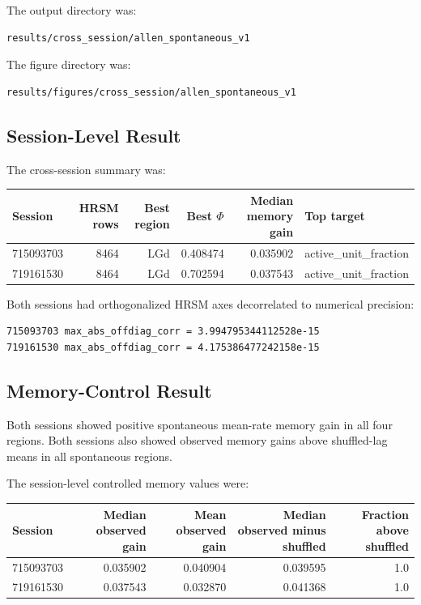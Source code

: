 The output directory was:

\begin{verbatim}
results/cross_session/allen_spontaneous_v1
\end{verbatim}

The figure directory was:

\begin{verbatim}
results/figures/cross_session/allen_spontaneous_v1
\end{verbatim}

\subsection{Session-Level Result}

The cross-session summary was:

\begin{center}
\begin{tabular}{lrrrrl}
\hline
Session & HRSM rows & Best region & Best \(\Phi\) & Median memory gain & Top target \\
\hline
715093703 & 8464 & LGd & 0.408474 & 0.035902 & active\_unit\_fraction \\
719161530 & 8464 & LGd & 0.702594 & 0.037543 & active\_unit\_fraction \\
\hline
\end{tabular}
\end{center}

Both sessions had orthogonalized HRSM axes decorrelated to numerical precision:

\begin{verbatim}
715093703 max_abs_offdiag_corr = 3.994795344112528e-15
719161530 max_abs_offdiag_corr = 4.175386477242158e-15
\end{verbatim}

\subsection{Memory-Control Result}

Both sessions showed positive spontaneous mean-rate memory gain in all four regions. Both sessions also showed observed memory gains above shuffled-lag means in all spontaneous regions.

The session-level controlled memory values were:

\begin{center}
\begin{tabular}{lrrrr}
\hline
Session & Median observed gain & Mean observed gain & Median observed minus shuffled & Fraction above shuffled \\
\hline
715093703 & 0.035902 & 0.040904 & 0.039595 & 1.0 \\
719161530 & 0.037543 & 0.032870 & 0.041368 & 1.0 \\
\hline
\end{tabular}
\end{center}

